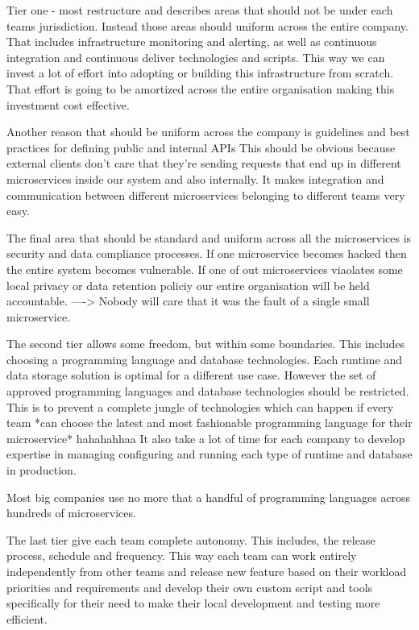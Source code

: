 \documentclass[a4paper, 11pt]{book}
\begin{document}
    Tier one - most restructure and describes areas that should not be under each teams jurisdiction.
    Instead those areas should uniform across the entire company.
    That includes infrastructure monitoring and alerting, as well as continuous integration and continuous deliver technologies and scripts.
    This way we can invest a lot of effort into adopting or building this infrastructure from scratch.
    That effort is going to be amortized across the entire organisation making this investment cost effective.

    Another reason that should be uniform across the company is guidelines and best practices for defining public and internal APIs
    This should be obvious because external clients don't care that they're sending requests that end up in different microservices inside our system and also internally.
    It makes integration and communication between different microservices belonging to different teams very easy.

    The final area that should be standard and uniform across all the microservices is security and data compliance processes.
    If one microservice becomes hacked then the entire system becomes vulnerable. If one of out microservices viaolates some local privacy or data retention policiy our entire organisation will be held accountable.
    ----> Nobody will care that it was the fault of a single small microservice.

    The second tier allows some freedom, but within some boundaries.
    This includes choosing a programming language and database technologies.
    Each runtime and data storage solution is optimal for a different use case.
    However the set of approved programming languages and database technologies should be restricted.
    This is to prevent a complete jungle of technologies which can happen if every team *can choose the latest and most fashionable programming language for their microservice* hahahahhaa
    It also take a lot of time for each company to develop expertise in managing configuring and running each type of runtime and database in production.

    Most big companies use no more that a handful of programming languages across hundreds of microservices.

    The last tier give each team complete autonomy.
    This includes, the release process, schedule and frequency.
    This way each team can work entirely independently from other teams and release new feature based on their workload priorities and requirements and develop their own custom script and tools specifically for their need to make their local development and testing more efficient.
\end{document}
